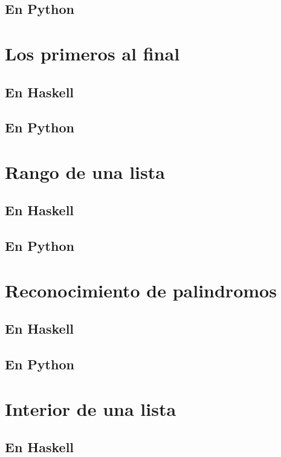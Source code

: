 \documentclass[a4paper,12pt,twoside]{book}
\begin{document}
\subsection*{En Python}

\section{Los primeros al final}
\subsection*{En Haskell}
\subsection*{En Python}

\section{Rango de una lista}
\subsection*{En Haskell}
\subsection*{En Python}

\section{Reconocimiento de palindromos}
\subsection*{En Haskell}
\subsection*{En Python}

\section{Interior de una lista}
\subsection*{En Haskell}
\end{document}
